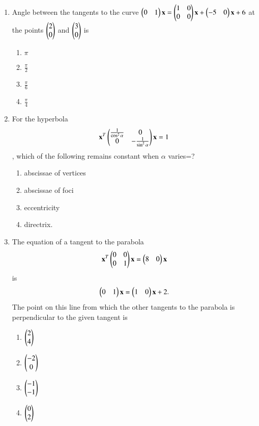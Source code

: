 \documentclass[journal,12pt,twocolumn]{IEEEtran}
\begin{document}
\begin{enumerate}[label=\arabic*]
\begin{enumerate}
    \end{enumerate}
    \item Angle between the tangents to the curve $\begin{pmatrix}0&1\end{pmatrix}\mathbf{x}=\begin{pmatrix}1&0\\0&0\end{pmatrix}\mathbf{x}+\begin{pmatrix}-5&0\end{pmatrix}\mathbf{x}+6$ at the points $\begin{pmatrix}2\\0\end{pmatrix}$ and $\begin{pmatrix}3\\0\end{pmatrix}$ is 
    \begin{enumerate}
    \item $\pi$
    \item $\frac{\pi}{2}$ 
    \item $\frac{\pi}{6}$
    \item $\frac{\pi}{4}$ 
    \end{enumerate}
    \item For the hyperbola
    \begin{align}
    \mathbf{x}^T\begin{pmatrix}\frac{1}{\cos^2\alpha}&0\\0&-\frac{1}{\sin^2\alpha}\end{pmatrix}
    \mathbf{x}=1
    \end{align}, which of the following remains constant when $\alpha$ varies=?
    \begin{enumerate}
    \item abscissae of vertices
    \item abscissae of foci
    \item eccentricity
    \item directrix.
    \end{enumerate}
    \item The equation of a tangent to the parabola
    \begin{align}
    \mathbf{x}^T\begin{pmatrix}0&0\\0&1\end{pmatrix}\mathbf{x}=\begin{pmatrix}8&0\end{pmatrix}\mathbf{x}
    \end{align}is
    \begin{align} \begin{pmatrix}0&1\end{pmatrix}\mathbf{x}=\begin{pmatrix}1&0\end{pmatrix}\mathbf{x}+2.
    \end{align} The point on this line from which the other tangents to the parabola is perpendicular to the given tangent is
    \begin{enumerate}
    \item $\begin{pmatrix}2\\4\end{pmatrix}$
    \item $\begin{pmatrix}-2\\0\end{pmatrix}$ 
    \item $\begin{pmatrix}-1\\-1\end{pmatrix}$
    \item $\begin{pmatrix}0\\2\end{pmatrix}$ 
    \end{enumerate}

\end{enumerate}
\end{document}

